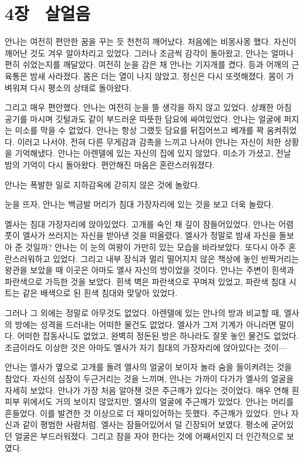 

\chapter[4장  살얼음][4장\hspace*{.5em}살얼음]{4장 \ 살얼음}



안나는 여전히 편안한 꿈을 꾸는 듯 천천히 깨어났다. 처음에는 비몽사몽 했다. 자신이 깨어난 것도 겨우 알아차리고 있었다. 그러나 조금씩 감각이 돌아왔고, 안나는 얼마나 편히 쉬었는지를 깨달았다. 여전히 눈을 감은 채 안나는 기지개를 켰다. 등과 어깨의 근육통은 밤새 사라졌다. 몸은 더는 열이 나지 않았고, 정신은 다시 또렷해졌다. 몸이 가벼워져 다시 평소의 상태로 돌아왔다.

그리고 매우 편안했다. 안나는 여전히 눈을 뜰 생각을 하지 않고 있었다. 상쾌한 아침 공기를 마시며 깃털과도 같이 부드러운 따뜻한 담요에 싸여있었다. 안나는 얼굴에 퍼지는 미소를 막을 수 없었다. 안나는 항상 그랬듯 담요를 뒤집어쓰고 베개를 꽉 움켜쥐었다. 이러고 나서야, 전혀 다른 무게감과 감촉을 느끼고 나서야 안나는 자신이 처한 상황을 기억해냈다. 안나는 아렌델에 있는 자신의 집에 있지 않았다. 미소가 가셨고, 전날 밤의 기억이 다시 돌아왔다. 편안해진 마음은 혼란스러워졌다.

안나는 폭발한 일로 지하감옥에 갇히지 않은 것에 놀랐다.

눈을 뜨자, 안나는 백금발 머리가 침대 가장자리에 있는 것을 보고 더욱 놀랐다.

엘사는 침대 가장자리에 앉아있었다. 고개를 숙인 채 깊이 잠들어있었다. 안나는 어렴풋이 엘사가 쓰러지는 자신을 받아낸 것을 떠올렸다. 엘사가 정말로 밤새 자신을 돌보아 준 것일까? 안나는 이 눈의 여왕이 가만히 있는 모습을 바라보았다. 또다시 아주 혼란스러워하고 있었다. 그리고 내부 장식과 멀리 떨어지지 않은 책상에 놓인 반짝거리는 왕관을 보았을 때 이곳은 아마도 엘사 자신의 방이었을 것이다. 안나는 주변이 흰색과 파란색으로 가득한 것을 보았다. 흰색 벽은 파란색으로 꾸며져 있었고, 파란색 침대 시트는 같은 배색으로 된 흰색 침대와 맞닿아 있었다.

그러나 그 외에는 정말로 아무것도 없었다. 아렌델에 있는 안나의 방과 비교할 때, 엘사의 방에는 성격을 드러내는 어떠한 물건도 없었다. 엘사가 그저 기계가 아니라면 말이다. 어떠한 잡동사니도 없었고, 완벽히 정돈된 방은 하나라도 잘못 놓인 물건도 없었다. 조금이라도 이상한 것은 아마도 엘사가 자기 침대의 가장자리에 앉아있다는 것이—

안나는 엘사가 옆으로 고개를 돌려 엘사의 얼굴이 보이자 놀라 숨을 들이켜려는 것을 참았다. 자신의 심장이 두근거리는 것을 느끼며, 안나는 가까이 다가가 엘사의 얼굴을 자세히 보았다. 안나가 가장 처음 알아챈 것은 주근깨가 있다는 것이었다. 매우 연해 흰 피부 위에서도 거의 보이지 않았지만, 엘사의 얼굴에 주근깨가 있었다. 안나는 머리를 흔들었다. 이를 발견한 것 이상으로 더 재미있어하는 듯했다. 주근깨가 있었다. 안나 자신과 같이 평범한 사람처럼. 엘사는 잠들어있어서 덜 긴장되어 보였다. 평소에 굳어있던 얼굴은 부드러워졌다. 그리고 잠을 자야 한다는 것에 어째서인지 더 인간적으로 보였다.

